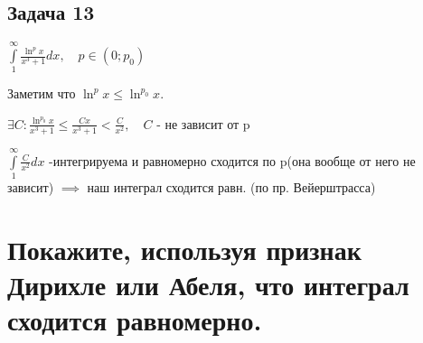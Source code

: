 \documentclass[a4paper, fleqn]{article}
\begin{document}

\subsection*{Задача 13}
$\displaystyle\int\limits_1^{\infty} \frac{\ln^p x}{x^3+1} dx, \quad p \in (0; p_0)$

Заметим что $\displaystyle\ln^px \leq \ln^{p_0}x$.

$\displaystyle\exists C: \frac{\ln^{p_0} x}{x^3+1} \leq  \frac{Cx}{x^3+1} <  \frac{C}{x^2}, \quad C$ - не зависит от p 

$\displaystyle\int\limits_1^\infty \frac{C}{x^2} dx$ -интегрируема и равномерно сходится по p(она вообще от него не зависит) $\implies$ наш интеграл сходится равн. (по пр. Вейерштрасса)

\section*{Покажите, используя признак Дирихле или Абеля, что интеграл сходится равномерно.}





\end{document}
